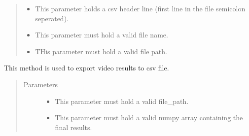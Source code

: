 \documentclass[letterpaper,10pt,english,openany,oneside]{sphinxmanual}
\begin{document}
\begin{fulllineitems}
\begin{fulllineitems}
\begin{quote}
\begin{description}
\begin{itemize}
\item {} 
 \textendash{} This parameter holds a csv header line (first line in the file \sphinxhyphen{} semicolon seperated).

\item {} 
 \textendash{} This parameter must hold a valid file name.

\item {} 
 \textendash{} THis parameter must hold a valid file path.

\end{itemize}

\end{description}\end{quote}

\end{fulllineitems}


\begin{fulllineitems}
\label{\detokenize{Evaluation:sbd.Evaluation.Evaluation.exportMovieResultsToCSV}}
This method is used to export video results to csv file.
\begin{quote}\begin{description}
\item[{Parameters}] \leavevmode\begin{itemize}
\item {} 
 \textendash{} This parameter must hold a valid file\_path.

\item {} 
 \textendash{} This parameter must hold a valid numpy array containing the final results.

\end{itemize}

\end{description}\end{quote}

\end{fulllineitems}



\end{fulllineitems}
\end{document}
